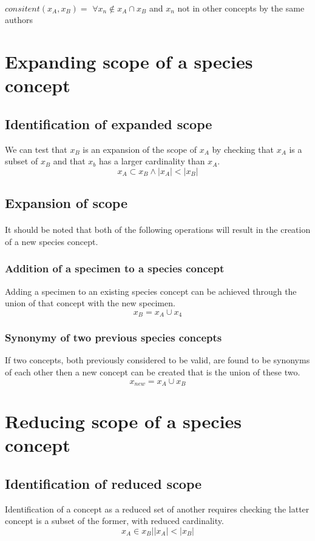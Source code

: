\documentclass{article}
\begin{document}
   \paragraph{}
   $consitent(x_A,x_B) =$ $\forall x_n \notin x_A \cap x_B$  and $x_n$ not in other concepts by the same authors
   
   \section{Expanding scope of a species concept}
   \subsection{Identification of expanded scope}
   We can test that $x_B$ is an expansion of the scope of $x_A$ by checking that $x_A$ is a subset of $x_B$ and that $x_b$ has a larger cardinality than $x_A$.
   \[x_A \subset x_B \land \left|x_A\right| < \left|x_B\right|\]
   
   \subsection{Expansion of scope}
   \paragraph{}
   It should be noted that both of the following operations will result in the creation of a new species concept.
   \subsubsection{Addition of a specimen to a species concept}
   Adding a specimen to an existing species concept can be achieved through the union of that concept with the new specimen.
   \[x_B = x_A \cup x_4\]
   
   \subsubsection{Synonymy of two previous species concepts}
   If two concepts, both previously considered to be valid, are found to be synonyms of each other then a new concept can be created that is the union of these two.
   \[x_{new}=x_A \cup x_B\]
   
   \section{Reducing scope of a species concept}
   \subsection{Identification of reduced scope}
   Identification of a concept as a reduced set of another requires checking the latter concept is a subset of the former, with reduced cardinality.
   \[x_A \in x_B|\left|x_A\right| < \left|x_B\right|\]
\end{document}
